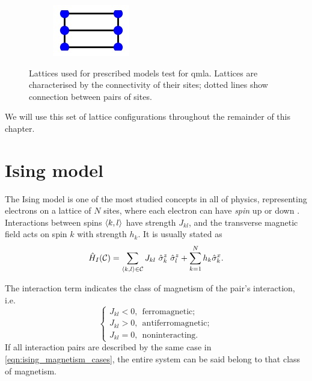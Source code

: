 \begin{figure}
\begin{center}
\begin{subfigure}{2.25cm}
            \caption{}
        \end{subfigure}
        \qquad
        \begin{subfigure}{2cm} 
            \includegraphics{theoretical_study/figures/lattices/_6_site_grid.jpg}        
            \caption{}
        \end{subfigure}
    \end{center}
    \caption[Lattices for prescribed \gls{qmla} ]{
        Lattices used for prescribed models test for \gls{qmla}.
        Lattices are characterised by the connectivity of their sites; 
            dotted lines show connection between pairs of sites.                 
    }
    \label{fig:lattices}
\end{figure}

We will use this set of lattice configurations throughout the remainder of this chapter. 

\section{Ising model}\label{sec:ising}
The Ising model is one of the most studied concepts in all of physics, 
    representing electrons on a lattice of $N$ sites, 
    where each electron can have \emph{spin} up or down 
    \cite{ising1925beitrag, onsager1944crystal, brush1967history}.
Interactions between spins ${ \langle k, l \rangle }$ have strength $J_{kl}$, 
    and the transverse magnetic field acts on spin $k$ with strength $h_k$. 
It is usually stated as 
\begin{equation}
    \label{eqn:ising_standard_form}
    \hat{H}_I(\cc) = \sum_{\bkl \in \mathcal{C}} J_{kl}  \ \hat{\sigma}_k^z \ \hat{\sigma}_{l}^z + \sum_{k=1}^{N} h_k \hat{\sigma}_{k}^x.
\end{equation}

The interaction term indicates the class of magnetism of the pair's interaction, i.e. 
\begin{equation}
    \label{eqn:ising_magnetism_cases}
    \begin{cases}
        J_{kl} < 0, \ \ \textrm{ferromagnetic}; \\
        J_{kl} > 0, \ \ \textrm{antiferromagnetic}; \\
        J_{kl} = 0, \ \ \textrm{noninteracting}.
    \end{cases}
\end{equation}
If all interaction pairs are described by the same case in \cref{eqn:ising_magnetism_cases}, 
    the entire system can be said belong to that class of magnetism. 

